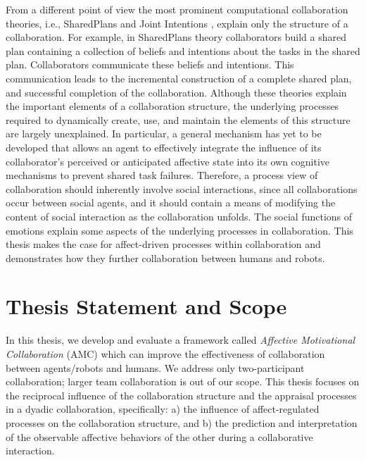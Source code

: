 \documentclass[12pt]{report}
\begin{document}
From a different point of view the most prominent computational collaboration
theories, i.e., SharedPlans
\cite{grosz:collaboration,grosz:plans-discourse} and Joint
Intentions \cite{cohen:teamwork}, explain only the structure of a collaboration.
For example, in SharedPlans theory collaborators build a shared plan containing
a collection of beliefs and intentions about the tasks in the shared plan.
Collaborators communicate these beliefs and intentions. This communication leads
to the incremental construction of a complete shared plan, and successful
completion of the collaboration. Although these theories explain the important
elements of a collaboration structure, the underlying processes required to
dynamically create, use, and maintain the elements of this structure are largely
unexplained. In particular, a general mechanism has yet to be developed that
allows an agent to effectively integrate the influence of its collaborator's
perceived or anticipated affective state into its own cognitive mechanisms to
prevent shared task failures. Therefore, a process view of collaboration should
inherently involve social interactions, since all collaborations occur between
social agents, and it should contain a means of modifying the content of social
interaction as the collaboration unfolds. The social functions of emotions
explain some aspects of the underlying processes in collaboration. This thesis
makes the case for affect-driven processes within collaboration and demonstrates
how they further collaboration between humans and robots.

\section{Thesis Statement and Scope}

In this thesis, we develop and evaluate a framework called \textit{Affective
Motivational Collaboration} (AMC) which can improve the effectiveness of
collaboration between agents/robots and humans. We address only two-participant
collaboration; larger team collaboration is out of our scope. This thesis
focuses on the reciprocal influence of the collaboration structure and the
appraisal processes in a dyadic collaboration, specifically: a) the influence of
affect-regulated processes on the collaboration structure, and b) the prediction
and interpretation of the observable affective behaviors of the other during a
collaborative interaction.
\end{document}
